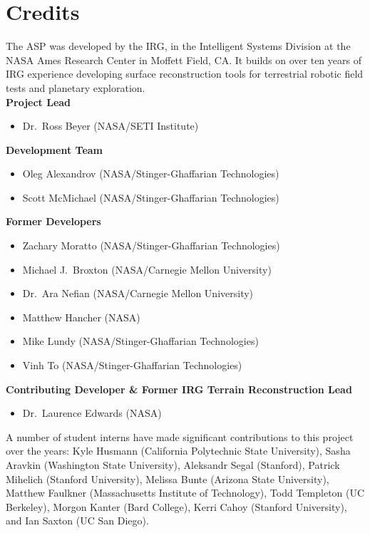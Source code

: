 \chapter*{Credits}

The \ac{ASP} was developed by the \ac{IRG}, in the Intelligent Systems
Division at the \ac{NASA} Ames Research Center in Moffett Field, CA. It
builds on over ten years of IRG experience developing surface
reconstruction tools for terrestrial robotic field tests and planetary
exploration. \\

{\bf Project Lead}
\begin {itemize}
\item Dr.~Ross Beyer (NASA/SETI Institute)
\end{itemize}

{\bf Development Team}
\begin{itemize}
\item Oleg Alexandrov (NASA/Stinger-Ghaffarian Technologies)
\item Scott McMichael (NASA/Stinger-Ghaffarian Technologies)
\end{itemize}

{\bf Former Developers}
\begin{itemize}
\item Zachary Moratto (NASA/Stinger-Ghaffarian Technologies)
\item Michael J.~Broxton (NASA/Carnegie Mellon University)
\item Dr.~Ara Nefian (NASA/Carnegie Mellon University)
\item Matthew Hancher (NASA)
\item Mike Lundy (NASA/Stinger-Ghaffarian Technologies)
\item Vinh To (NASA/Stinger-Ghaffarian Technologies)
\end{itemize}

{\bf Contributing Developer \& Former IRG Terrain Reconstruction Lead}
\begin{itemize}
\item Dr.~Laurence Edwards (NASA)
\end{itemize}

A number of student interns have made significant contributions to
this project over the years: Kyle Husmann (California Polytechnic
State University), Sasha Aravkin (Washington State University),
Aleksandr Segal (Stanford), Patrick Mihelich (Stanford University),
Melissa Bunte (Arizona State University), Matthew Faulkner
(Massachusetts Institute of Technology), Todd Templeton (UC Berkeley),
Morgon Kanter (Bard College), Kerri Cahoy (Stanford University), and
Ian Saxton (UC San Diego).

